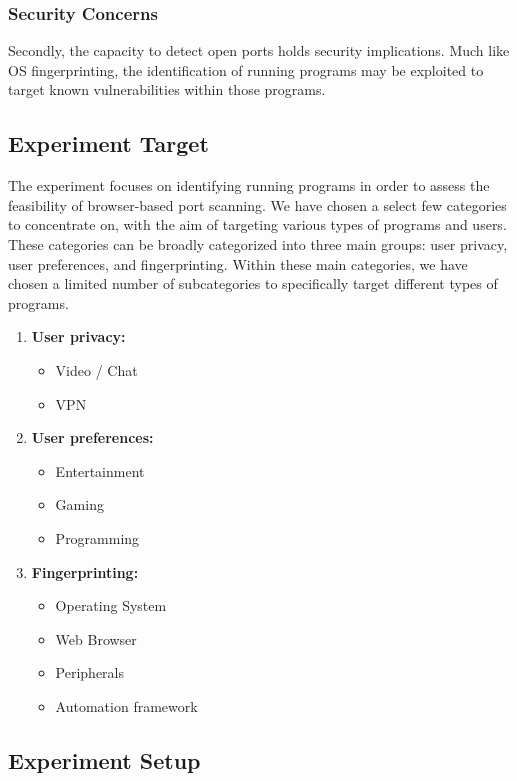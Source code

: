 \subsubsection{Security Concerns}

Secondly, the capacity to detect open ports holds security implications. Much like OS fingerprinting, the identification of running programs may be exploited to target known vulnerabilities within those programs. 

\subsection{Experiment Target}

The experiment focuses on identifying running programs in order to assess the feasibility of browser-based port scanning. We have chosen a select few categories to concentrate on, with the aim of targeting various types of programs and users.
These categories can be broadly categorized into three main groups: user privacy, user preferences, and fingerprinting. Within these main categories, we have chosen a limited number of subcategories to specifically target different types of programs.

\begin{enumerate}
    \item \textbf{User privacy:}
    \begin{itemize}
        \item Video / Chat
        \item VPN
    \end{itemize}
    \item \textbf{User preferences:}
    \begin{itemize}
        \item Entertainment
        \item Gaming
        \item Programming
    \end{itemize}
    \item \textbf{Fingerprinting:}
    \begin{itemize}
        \item Operating System
        \item Web Browser
        \item Peripherals
        \item Automation framework
    \end{itemize}
\end{enumerate}

\subsection{Experiment Setup}

